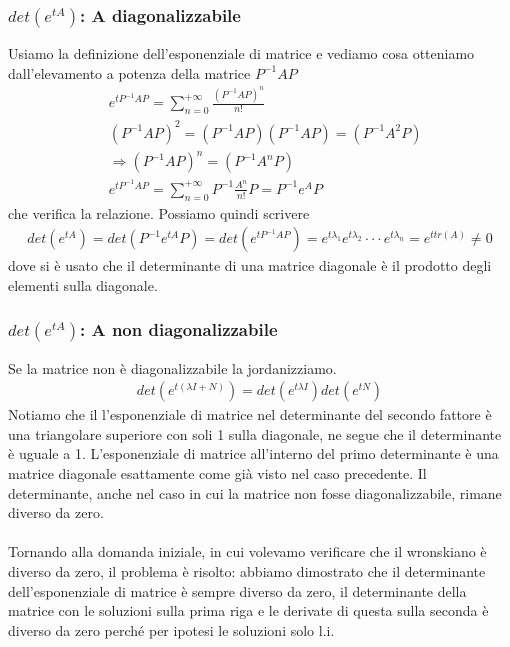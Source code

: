 \documentclass[10pt,a4paper]{article}
\begin{document}
 \subsubsection{\(det(e^{tA})\): A diagonalizzabile}
Usiamo la definizione dell'esponenziale di matrice e vediamo cosa otteniamo dall'elevamento a potenza della matrice \(P^{-1}A P\)
\begin{align*}
	&e^{t P^{-1}A P} = \sum_{n=0}^{+\infty}\frac{(P^{-1}AP)^n}{n!}\\
	&(P^{-1}AP)^2 = (P^{-1}AP)(P^{-1}AP)=(P^{-1}A^2P)\\
	&\Rightarrow (P^{-1}AP)^n = (P^{-1}A^n P)\\
	&e^{t P^{-1}A P} = \sum_{n=0}^{+\infty}P^{-1}\frac{A^n }{n!}P = P^{-1}e^{A}P
\end{align*}
che verifica la relazione. Possiamo quindi scrivere 
\begin{align*}
	det(e^{tA}) = det(P^{-1}e^{tA}P) = det(e^{t P^{-1}A P}) = e^{t\lambda_1}e^{t\lambda_2}\cdot\cdot\cdot e^{t \lambda_n}=e^{t tr(A)} \neq 0
\end{align*}
dove si è usato che il determinante di una matrice diagonale è il prodotto degli elementi sulla diagonale. 
\subsubsection{\(det(e^{tA})\): A non diagonalizzabile}
Se la matrice non è diagonalizzabile la jordanizziamo.
\begin{align*}
	det(e^{t (\lambda I+N)}) = det(e^{t \lambda I})det(e^{tN})
	\end{align*}
	Notiamo che il l'esponenziale di matrice nel determinante del secondo fattore è una triangolare superiore con soli 1 sulla diagonale, ne segue che il determinante è uguale a 1. L'esponenziale di matrice all'interno del primo determinante è una matrice diagonale esattamente come già visto nel caso precedente. Il determinante, anche nel caso in cui la matrice non fosse diagonalizzabile, rimane diverso da zero.\\\\
	
	Tornando alla domanda iniziale, in cui volevamo verificare che il wronskiano è diverso da zero, il problema è risolto: abbiamo dimostrato che il determinante dell'esponenziale di matrice è sempre diverso da zero, il determinante della matrice con le soluzioni sulla prima riga e le derivate di questa sulla seconda è diverso da zero perché per ipotesi le soluzioni solo l.i.
\end{document}
